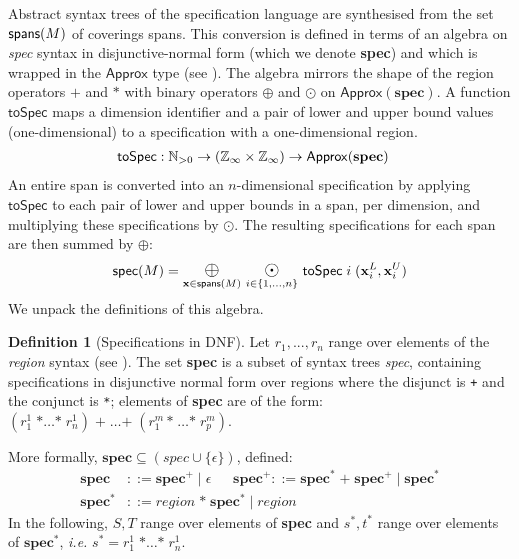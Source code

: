 \documentclass[10pt,preprint]{sigplanconf}
\newcounter{block}
\theoremstyle{definition}
\newtheorem{definition}[block]{Definition}
\newcommand{\ie}{\emph{i.e.}}
\newcommand{\term}[1]{\texttt{#1}}
\newcommand{\vect}[1]{\textbf{#1}}
\begin{document}
\newcommand{\oplusbig}{\operatornamewithlimits{\term{\Large{$\oplus$}}}}
\newcommand{\odobig}{\operatornamewithlimits{\term{\Large{$\odot$}}}}
\newcommand{\bplus}{\operatornamewithlimits{\term{\Large{+}}}}
\newcommand{\tySum}[1]{#1^{\term{+}}}
\newcommand{\tyProd}[1]{#1^{\term{*}}}
\newcommand{\specDNF}{\textbf{spec}}

Abstract syntax trees of the specification language
are synthesised from the set $\textsf{spans}(M)$ of coverings spans.
This conversion is defined in terms
of an algebra on \textit{spec} syntax in disjunctive-normal form
(which we denote \specDNF{}) and which is wrapped
in the $\textsf{Approx}$ type (see
).  The algebra mirrors the shape
of the region operators $\term{+}$ and $\term{*}$ 
with binary operators $\oplus$ and $\odot$ on
$\mathsf{Approx}(\specDNF)$.
A function $\mathsf{toSpec}$ maps a dimension identifier
and a pair of lower and upper bound
values (one-dimensional) to a specification with a one-dimensional region.
\begin{align*}
\mathsf{toSpec} & : \mathbb{N}_{>0} \rightarrow (\domainVal{} \times \domainVal{}) \rightarrow \mathsf{Approx}(\specDNF)
\end{align*}
An entire span is converted into an $n$-dimensional
specification by applying $\mathsf{toSpec}$ to each
pair of lower and upper bounds in a span, per dimension, and multiplying these
specifications by $\odot$. The resulting specifications for
each span are then summed by $\oplus$:
\begin{equation*}
\textsf{spec}(M) =
\oplusbig\limits_{\vect{x} \in \spanOp(M)} \,
\odobig\limits_{i \in \{1, \ldots, n\}} \, \mathsf{toSpec} \; i \; (\vect{x}^L_i, \vect{x}^U_i)
\end{equation*}
We unpack the definitions of this algebra.

\begin{definition}[Specifications in DNF]
Let $r_1, ..., r_n$ range over elements of the \textit{region}
syntax (see ).
The set \specDNF{} is a subset of syntax trees \textit{spec},
containing specifications in disjunctive normal form over regions
where the disjunct is \term{+} and the conjunct is \term{*}; 
 elements of \specDNF{} are of the form:
$
(r^1_{1} \; \term{*} \ldots \term{*} \; r^1_n)\; \term{+} \; \ldots
\term{+} \; (r^m_1 \, \term{*} \; \ldots \term{*} \; r^m_p)
$.

More formally, $\specDNF \subseteq (\textit{spec} \cup \{\epsilon\})$, defined:
\begin{align*}
\specDNF{} & ::= \tySum{\specDNF} \mid \epsilon \quad\;\;
\tySum{\specDNF} ::= \tyProd{\specDNF} \; \term{+} \; \tySum{\specDNF} \mid
  \tyProd{\specDNF} \\
\tyProd{\specDNF} & ::= \textit{region} \; \term{*} \; \tyProd{\specDNF} \mid
   \textit{region}
\end{align*}
In the following, $S, T$ range over elements of
\specDNF{} and $\tyProd{s}, \tyProd{t}$ range over elements
of $\tyProd{\specDNF}$, \ie{} $\tyProd{s} = r^1_{1} \; \term{*}
\ldots \term{*} \; r^1_n$.
\end{definition}
\end{document}

